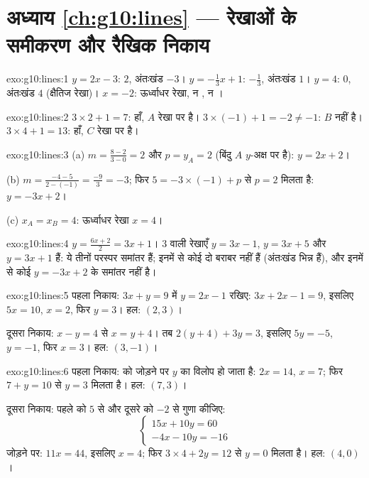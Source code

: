 \section*{अध्याय \ref{ch:g10:lines} --- रेखाओं के समीकरण और रैखिक निकाय}

\begin{solution}{exo:g10:lines:1}
$y = 2x - 3$:  $2$, अंतःखंड $-3$।
$y = -\frac13 x + 1$:  $-\frac13$, अंतःखंड $1$।
$y = 4$:  $0$, अंतःखंड $4$ (क्षैतिज रेखा)।
$x = -2$: ऊर्ध्वाधर रेखा, न , न ।
\end{solution}

\begin{solution}{exo:g10:lines:2}
$3 \times 2 + 1 = 7$: हाँ, $A$ रेखा पर है।
$3 \times (-1) + 1 = -2 \neq -1$: $B$ नहीं है।
$3 \times 4 + 1 = 13$: हाँ, $C$ रेखा पर है।
\end{solution}

\begin{solution}{exo:g10:lines:3}
(a) $m = \frac{8 - 2}{3 - 0} = 2$ और $p = y_A = 2$ (बिंदु $A$ $y$-अक्ष पर है): $y = 2x + 2$।

(b) $m = \frac{-4 - 5}{2 - (-1)} = \frac{-9}{3} = -3$; फिर $5 = -3 \times (-1) + p$ से $p = 2$ मिलता है: $y = -3x + 2$।

(c) $x_A = x_B = 4$: ऊर्ध्वाधर रेखा $x = 4$।
\end{solution}

\begin{solution}{exo:g10:lines:4}
$y = \frac{6x+2}{2} = 3x + 1$।  $3$ वाली रेखाएँ $y = 3x - 1$, $y = 3x + 5$ और $y = 3x + 1$ हैं: ये तीनों परस्पर
समांतर हैं; इनमें से कोई दो बराबर नहीं हैं (अंतःखंड भिन्न हैं), और इनमें से
कोई $y = -3x + 2$ के समांतर नहीं है।
\end{solution}

\begin{solution}{exo:g10:lines:5}
पहला निकाय: $3x + y = 9$ में $y = 2x - 1$ रखिए: $3x + 2x - 1 = 9$, इसलिए $5x = 10$, $x = 2$, फिर $y = 3$। हल: $(2, 3)$।

दूसरा निकाय: $x - y = 4$ से $x = y + 4$। तब $2(y + 4) + 3y = 3$, इसलिए $5y = -5$, $y = -1$, फिर $x = 3$। हल: $(3, -1)$।
\end{solution}

\begin{solution}{exo:g10:lines:6}
पहला निकाय:  को जोड़ने पर $y$ का विलोप हो जाता है: $2x = 14$, $x = 7$; फिर
$7 + y = 10$ से $y = 3$ मिलता है। हल: $(7, 3)$।

दूसरा निकाय: पहले  को $5$ से और दूसरे को $-2$ से गुणा कीजिए:
\[
\begin{cases}
15x + 10y = 60 \\
-4x - 10y = -16
\end{cases}
\]
जोड़ने पर: $11x = 44$, इसलिए $x = 4$; फिर $3 \times 4 + 2y = 12$ से $y = 0$ मिलता है। हल: $(4, 0)$।
\end{solution}

